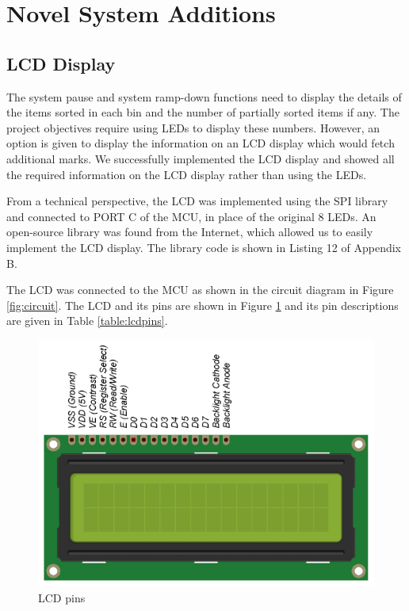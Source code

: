 \section{Novel System Additions}
\subsection*{LCD Display}
The system pause and system ramp-down functions need to display the details of the items sorted in each bin and the number of partially sorted items if any. The project objectives require using LEDs to display these numbers. However, an option is given to display the information on an LCD display which would fetch additional marks. We successfully implemented the LCD display and showed all the required information on the LCD display rather than using the LEDs.

From a technical perspective, the LCD was implemented using the SPI library and connected to PORT C of the MCU, in place of the original 8 LEDs. An open-source library was found from the Internet, which allowed us to easily implement the LCD display. The library code is shown in Listing 12 of Appendix B. 

The LCD was connected to the MCU as shown in the circuit diagram in Figure \ref{fig:circuit}. The LCD and its pins are shown in Figure \ref{fig:lcd} and its pin descriptions are given in Table \ref{table:lcdpins}. 

\begin{figure}[tbph]
	\centering
	\includegraphics[width=0.65\linewidth]{"images/lcd"}
	\caption{LCD pins}
	\label{fig:lcd}
\end{figure}

